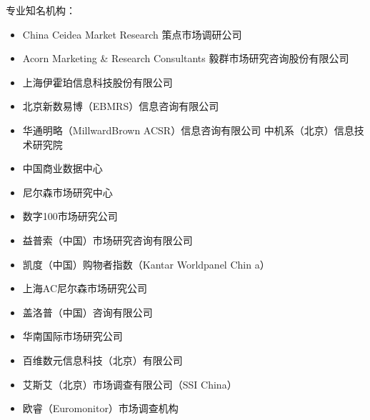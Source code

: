 \documentclass[letterpaper,11pt,english]{sphinxmanual}
\begin{document}
专业知名机构：
%
\begin{footnote}[434]\sphinxAtStartFootnote
{}
%
\end{footnote}
\begin{itemize}
\item {} 
China Ceidea Market Research 策点市场调研公司

\item {} 
Acorn Marketing \& Research Consultants 毅群市场研究咨询股份有限公司

\item {} 
上海伊霍珀信息科技股份有限公司

\item {} 
北京新数易博（EBMRS）信息咨询有限公司

\item {} 
华通明略（MillwardBrown ACSR）信息咨询有限公司
中机系（北京）信息技术研究院

\item {} 
中国商业数据中心

\item {} 
尼尔森市场研究中心

\item {} 
数字100市场研究公司

\item {} 
益普索（中国）市场研究咨询有限公司

\item {} 
凯度（中国）购物者指数（Kantar Worldpanel Chin\sphinxhyphen{} a）

\item {} 
上海AC尼尔森市场研究公司

\item {} 
盖洛普（中国）咨询有限公司

\item {} 
华南国际市场研究公司

\item {} 
百维数元信息科技（北京）有限公司

\item {} 
艾斯艾（北京）市场调查有限公司（SSI China）

\item {} 
欧睿（Euromonitor）市场调查机构

\end{itemize}
\end{document}
